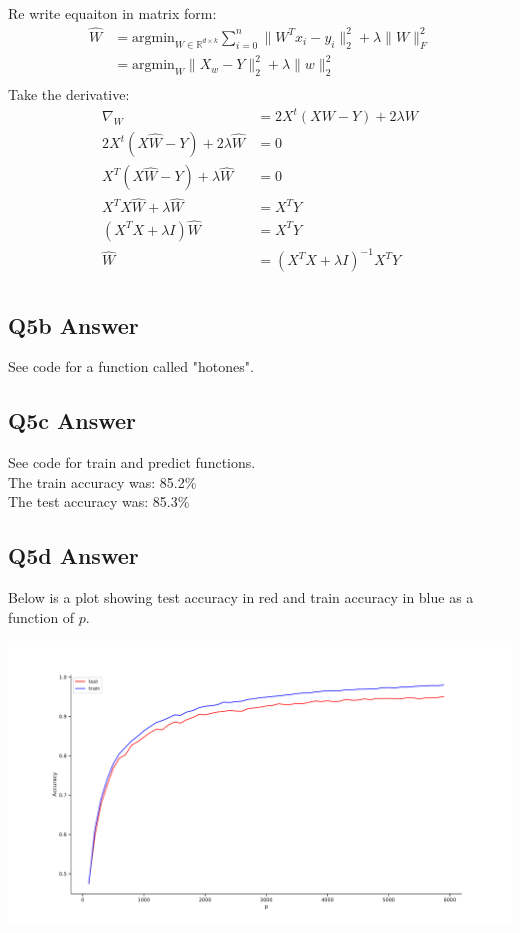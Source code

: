 \documentclass{article}
\newcommand{\1}{\mathbf{1}}
\def\R{\mathbb{R}}
\begin{document}
Re write equaiton in matrix form:
\begin{align*}
\widehat{W} & = \text{argmin}_{W \in \R^{d \times k}} \sum_{i=0}^{n} \| W^Tx_{i} - y_{i} \|^{2}_{2} + \lambda \|W\|_{F}^{2} \\
& = \text{argmin}_W \| X_w - Y \|_2^2 + \lambda \|w\|_2^2 \\
\end{align*}
Take the derivative:
\begin{align*}
    \nabla_{W} & = 2 X^t(X W -Y) + 2 \lambda W \\
    2 X^t(X\widehat{W} -Y) + 2 \lambda \widehat{W} & = 0 \\
    X^T(X\widehat{W} -Y) + \lambda \widehat{W} & = 0 \\
    X^TX\widehat{W} + \lambda \widehat{W} & = X^T Y \\
    (X^TX + \lambda I ) \widehat{W} & = X^T Y \\
     \widehat{W} & =(X^TX + \lambda I )^{-1} X^T Y \\
\end{align*}


\subsection{Q5b Answer}
See code for a function called "hotones". 

\subsection{Q5c Answer}
See code for train and predict functions. \\
The train accuracy was: 85.2\% \\
The test accuracy was: 85.3\% \\

\subsection{Q5d Answer}
Below is a plot showing test accuracy in red and train accuracy in blue as a function of $p$. 
\begin{center}
    \includegraphics[width=\textwidth]{hw1/P3.pdf}
\end{center}
\end{document}
